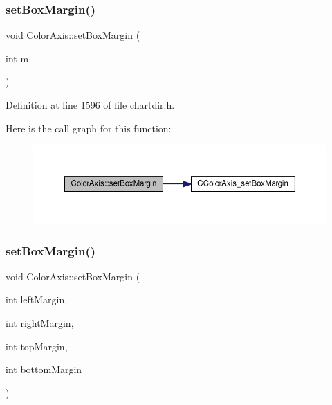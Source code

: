 \subsubsection{\texorpdfstring{set\+Box\+Margin()}{setBoxMargin()}\hspace{0.1cm}{\footnotesize\ttfamily [1/2]}}
{\footnotesize\ttfamily void Color\+Axis\+::set\+Box\+Margin (\begin{DoxyParamCaption}\item[{int}]{m }\end{DoxyParamCaption})\hspace{0.3cm}{\ttfamily [inline]}}



Definition at line 1596 of file chartdir.\+h.

Here is the call graph for this function\+:
\nopagebreak
\begin{figure}[H]
\begin{center}
\leavevmode
\includegraphics[width=350pt]{class_color_axis_ad60effdecee5281b5f6ddbfdd234afa8_cgraph}
\end{center}
\end{figure}
\mbox{\label{class_color_axis_a803f0b7b216c5095767afd61dcb62141}} 
\subsubsection{\texorpdfstring{set\+Box\+Margin()}{setBoxMargin()}\hspace{0.1cm}{\footnotesize\ttfamily [2/2]}}
{\footnotesize\ttfamily void Color\+Axis\+::set\+Box\+Margin (\begin{DoxyParamCaption}\item[{int}]{left\+Margin,  }\item[{int}]{right\+Margin,  }\item[{int}]{top\+Margin,  }\item[{int}]{bottom\+Margin }\end{DoxyParamCaption})\hspace{0.3cm}{\ttfamily [inline]}}



